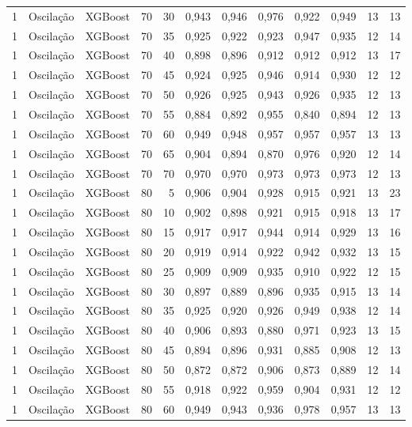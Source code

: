 \begin{longtable}{@{}rllrrrrrrrrr@{}}
1 & Oscilação & XGBoost & 70 & 30 & 0,943 & 0,946 & 0,976 & 0,922 & 0,949 & 13 & 13 \\
1 & Oscilação & XGBoost & 70 & 35 & 0,925 & 0,922 & 0,923 & 0,947 & 0,935 & 12 & 14 \\
1 & Oscilação & XGBoost & 70 & 40 & 0,898 & 0,896 & 0,912 & 0,912 & 0,912 & 13 & 17 \\
1 & Oscilação & XGBoost & 70 & 45 & 0,924 & 0,925 & 0,946 & 0,914 & 0,930 & 12 & 12 \\
1 & Oscilação & XGBoost & 70 & 50 & 0,926 & 0,925 & 0,943 & 0,926 & 0,935 & 12 & 13 \\
1 & Oscilação & XGBoost & 70 & 55 & 0,884 & 0,892 & 0,955 & 0,840 & 0,894 & 12 & 13 \\
1 & Oscilação & XGBoost & 70 & 60 & 0,949 & 0,948 & 0,957 & 0,957 & 0,957 & 13 & 13 \\
1 & Oscilação & XGBoost & 70 & 65 & 0,904 & 0,894 & 0,870 & 0,976 & 0,920 & 12 & 14 \\
1 & Oscilação & XGBoost & 70 & 70 & 0,970 & 0,970 & 0,973 & 0,973 & 0,973 & 12 & 13 \\
1 & Oscilação & XGBoost & 80 & 5 & 0,906 & 0,904 & 0,928 & 0,915 & 0,921 & 13 & 23 \\
1 & Oscilação & XGBoost & 80 & 10 & 0,902 & 0,898 & 0,921 & 0,915 & 0,918 & 13 & 17 \\
1 & Oscilação & XGBoost & 80 & 15 & 0,917 & 0,917 & 0,944 & 0,914 & 0,929 & 13 & 16 \\
1 & Oscilação & XGBoost & 80 & 20 & 0,919 & 0,914 & 0,922 & 0,942 & 0,932 & 13 & 15 \\
1 & Oscilação & XGBoost & 80 & 25 & 0,909 & 0,909 & 0,935 & 0,910 & 0,922 & 12 & 15 \\
1 & Oscilação & XGBoost & 80 & 30 & 0,897 & 0,889 & 0,896 & 0,935 & 0,915 & 13 & 14 \\
1 & Oscilação & XGBoost & 80 & 35 & 0,925 & 0,920 & 0,926 & 0,949 & 0,938 & 12 & 14 \\
1 & Oscilação & XGBoost & 80 & 40 & 0,906 & 0,893 & 0,880 & 0,971 & 0,923 & 13 & 15 \\
1 & Oscilação & XGBoost & 80 & 45 & 0,894 & 0,896 & 0,931 & 0,885 & 0,908 & 12 & 13 \\
1 & Oscilação & XGBoost & 80 & 50 & 0,872 & 0,872 & 0,906 & 0,873 & 0,889 & 12 & 14 \\
1 & Oscilação & XGBoost & 80 & 55 & 0,918 & 0,922 & 0,959 & 0,904 & 0,931 & 12 & 12 \\
1 & Oscilação & XGBoost & 80 & 60 & 0,949 & 0,943 & 0,936 & 0,978 & 0,957 & 13 & 13 \\

\end{longtable}
